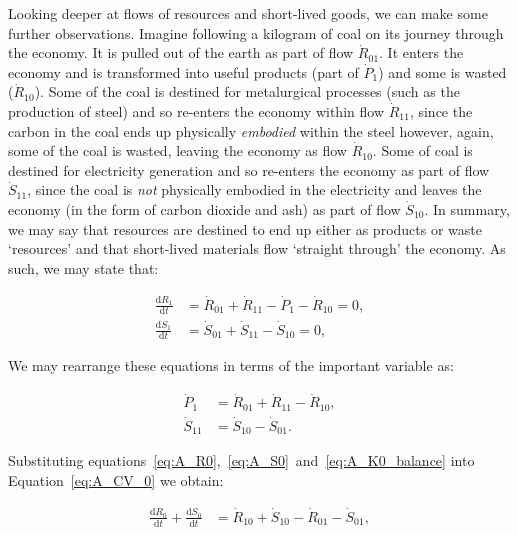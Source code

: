 Looking deeper at flows of resources and short-lived goods,
we can make some further observations. 
Imagine following a kilogram of coal on its journey
through the economy. It is pulled out of the earth as part
of flow $\dot{R}_{01}$. 
It enters the economy and is transformed into useful
products (part of $\dot{P}_{1}$) and some is wasted ($\dot{R}_{10}$).
Some of the coal is destined for metalurgical processes 
(such as the production of steel)
and so re-enters the economy within flow $\dot{R}_{11}$,
since the carbon in the coal ends up physically
\emph{embodied} within the steel however,
again,
some of the coal is wasted,
leaving the economy as flow $\dot{R}_{10}$. 
Some of coal is destined for electricity generation
and so re-enters the economy as part of flow $\dot{S}_{11}$,
since the coal is \emph{not} physically embodied
in the electricity and leaves the economy
(in the form of carbon dioxide and ash)
as part of flow $\dot{S}_{10}$.
In summary, we may say that resources are destined
to end up either as products or waste `resources'
and that short-lived materials flow `straight through'
the economy. 
As such,
we may state that:

\begin{align}
	\frac{\mathrm{d}R_1}{\mathrm{d}t}		&
	= \dot{R}_{01}
	+ \dot{R}_{11}
	- \dot{P}_{1}
	- \dot{R}_{10}
	= 0,															\\
\label{eq:A_S1_balance}
	\frac{\mathrm{d}S_1}{\mathrm{d}t}		&
	= \dot{S}_{01}
	+ \dot{S}_{11}
	- \dot{S}_{10}
	= 0,
\end{align}

We may rearrange these equations in terms of
the important variable as:

\begin{align}
\label{eq:A_P1a}
	\dot{P}_{1}												&
	= \dot{R}_{01}
	+ \dot{R}_{11}
	- \dot{R}_{10}	,										\\									
\label{eq:A_S11}
	\dot{S}_{11}											&
	= \dot{S}_{10}
	- \dot{S}_{01}.
\end{align}


Substituting equations~\ref{eq:A_R0},~\ref{eq:A_S0}~and~\ref{eq:A_K0_balance}
into Equation~\ref{eq:A_CV_0} we obtain:

\begin{align}\label{eq:A_CV_0a}
	\frac{\mathrm{d}R_0}{\mathrm{d}t}		
	+	\frac{\mathrm{d}S_0}{\mathrm{d}t}		&	
	=	\dot{R}_{10}		
	+	\dot{S}_{10}	
	-	\dot{R}_{01}											
	-	\dot{S}_{01},							%
\end{align}





